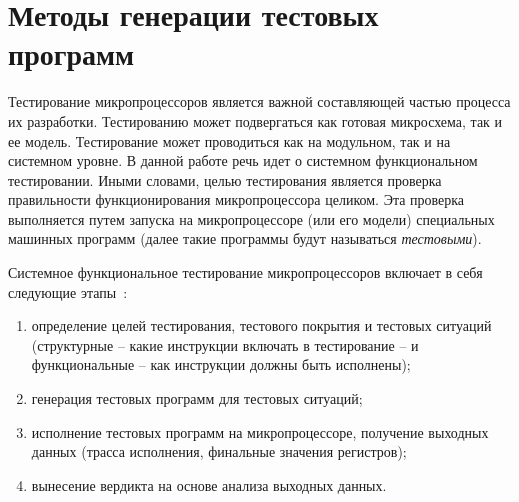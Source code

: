 \section{Методы генерации тестовых программ}

Тестирование микропроцессоров является важной составляющей частью
процесса их разработки. Тестированию может подвергаться как готовая
микросхема, так и ее модель. Тестирование может проводиться как на
модульном, так и на системном уровне. В данной работе речь идет о
системном функциональном тестировании. Иными словами, целью
тестирования является проверка правильности функционирования
микропроцессора целиком. Эта проверка выполняется путем запуска на
микропроцессоре (или его модели) специальных машинных программ
(далее такие программы будут называться \emph{тестовыми}).

Системное функциональное тестирование микропроцессоров включает в
себя следующие этапы~\cite{kamkin}:
\begin{enumerate}
\item определение целей тестирования, тестового покрытия и тестовых
ситуаций (структурные -- какие инструкции включать в тестирование --
и функциональные -- как инструкции должны быть исполнены);
\item генерация тестовых программ для тестовых ситуаций;
\item исполнение тестовых программ на микропроцессоре, получение
выходных данных (трасса исполнения, финальные значения регистров);
\item вынесение вердикта на основе анализа выходных данных.
\end{enumerate}

